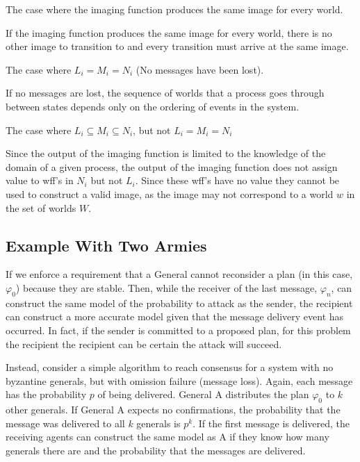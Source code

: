 \begin{case}
The case where the imaging function produces the same image for every world.
\end{case}

If the imaging function produces the same image for every world, there is no other image to transition to and every transition must arrive at the same image.

\begin{case}
The case where $L_i = M_i = N_i$ (No messages have been lost).
\end{case}

If no messages are lost, the sequence of worlds that a process goes through between states depends only on the ordering of events in the system. 

\begin{case}
The case where $L_i \subseteq M_i \subseteq N_i$, but not $L_i = M_i = N_i$
\end{case}

Since the output of the imaging function is limited to the knowledge of the domain of a given process, the output of the imaging function does not assign value to wff's in $N_i$ but not $L_i$. Since these wff's have no value they cannot be used to construct a valid image, as the image may not correspond to a world $w$ in the set of worlds $W$.

\subsection{Example With Two Armies}

If we enforce a requirement that a General cannot reconsider a plan (in this case, $\varphi_0$) because they are stable. Then, while the receiver of the last message, $\varphi_n$, can construct the same model of the probability to attack as the sender, the recipient can construct a more accurate model given that the message delivery event has occurred. In fact, if the sender is committed to a proposed plan, for this problem the recipient the recipient can be certain the attack will succeed.

Instead, consider a simple algorithm to reach consensus for a system with no byzantine generals, but with omission failure (message loss). Again, each message has the probability $p$ of being delivered. General A distributes the plan $\varphi_0$ to $k$ other generals. If General A expects no confirmations, the probability that the message was delivered to all $k$ generals is $p^k$. If the first message is delivered, the receiving agents can construct the same model as A if they know how many generals there are and the probability that the messages are delivered.

